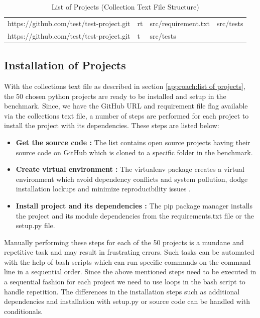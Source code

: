 \begin{table}[ht]
    \centering
    \begin{tabular}{llll}
    \hline
    https://github.com/test/test-project.git    & rt    & src/requirement.txt   & src/tests\\
    https://github.com/test/test-project.git    & t    & src/tests\\
    \hline
    \end{tabular}
    \caption{List of Projects (Collection Text File Structure)}
    \label{table:list of projects}
\end{table}

\subsection{Installation of Projects}
\label{approach:bash scripts}
With the collections text file as described in section \ref{approach:list of projects}, the 50 chosen python projects are ready to be installed and setup in the benchmark. Since, we have the GitHub URL and requirement file flag available via the collections text file, a number of steps are performed for each project to install the project with its dependencies. These steps are listed below:
\begin{itemize}
    \item \textbf{Get the source code :} The list contains open source projects having their source code on GitHub which is cloned to a specific folder in the benchmark. 
    \item \textbf{Create virtual environment :} The virtualenv \cite{virtualenv} package creates a virtual environment which avoid dependency conflicts and system pollution, dodge installation lockups and minimize reproducibility issues \cite{Why_Virtual_Env}.
    \item \textbf{Install project and its dependencies :} The pip package manager \cite{pip_package_manager} installs the project and its module dependencies from the requirements.txt file or the setup.py file.
\end{itemize}
Manually performing these steps for each of the 50 projects is a mundane and repetitive task and may result in frustrating errors.
Such tasks can be automated with the help of bash scripts which can run specific commands on the command line in a sequential order.
Since the above mentioned steps need to be executed in a sequential fashion for each project we need to use loops in the bash script to handle repetition.
The differences in the installation steps such as additional dependencies and installation with setup.py or source code can be handled with conditionals.

